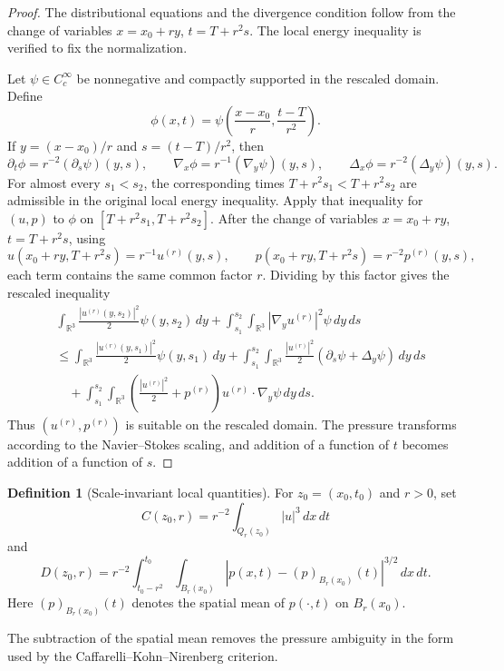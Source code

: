 \documentclass[11pt]{amsart}
\theoremstyle{plain}
\theoremstyle{definition}
\newtheorem{definition}[definition]{Definition}
\theoremstyle{remark}
\numberwithin{equation}{section}
\begin{document}
\begin{proof}
The distributional equations and the divergence condition follow from the
change of variables \(x=x_0+ry\), \(t=T+r^2s\).  The local energy inequality
is verified to fix the normalization.

Let \(\psi\in C_c^\infty\) be nonnegative and compactly supported in the
rescaled domain.  Define
\[
  \phi(x,t)=
  \psi\left(\frac{x-x_0}{r},\frac{t-T}{r^2}\right).
\]
If \(y=(x-x_0)/r\) and \(s=(t-T)/r^2\), then
\[
  \partial_t\phi=r^{-2}(\partial_s\psi)(y,s),\qquad
  \nabla_x\phi=r^{-1}(\nabla_y\psi)(y,s),\qquad
  \Delta_x\phi=r^{-2}(\Delta_y\psi)(y,s).
\]
For almost every \(s_1<s_2\), the corresponding times
\(T+r^2s_1<T+r^2s_2\) are admissible in the original local energy inequality.
Apply that inequality for \((u,p)\) to \(\phi\) on
\([T+r^2s_1,T+r^2s_2]\).  After the change of variables
\(x=x_0+ry\), \(t=T+r^2s\), using
\[
  u(x_0+ry,T+r^2s)=r^{-1}u^{(r)}(y,s),\qquad
  p(x_0+ry,T+r^2s)=r^{-2}p^{(r)}(y,s),
\]
each term contains the same common factor \(r\).  Dividing by this factor gives
the rescaled inequality
\[
\begin{aligned}
&\int_{\mathbb R^3}\frac{|u^{(r)}(y,s_2)|^2}{2}\psi(y,s_2)\,dy
 +\int_{s_1}^{s_2}\int_{\mathbb R^3}|\nabla_y u^{(r)}|^2\psi\,dy\,ds \\
&\le
 \int_{\mathbb R^3}\frac{|u^{(r)}(y,s_1)|^2}{2}\psi(y,s_1)\,dy
 +\int_{s_1}^{s_2}\int_{\mathbb R^3}
   \frac{|u^{(r)}|^2}{2}(\partial_s\psi+\Delta_y\psi)\,dy\,ds \\
&\quad
 +\int_{s_1}^{s_2}\int_{\mathbb R^3}
   \left(\frac{|u^{(r)}|^2}{2}+p^{(r)}\right)
   u^{(r)}\cdot\nabla_y\psi\,dy\,ds .
\end{aligned}
\]
Thus \((u^{(r)},p^{(r)})\) is suitable on the rescaled domain.  The pressure
transforms according to the Navier--Stokes scaling, and addition of a function
of \(t\) becomes addition of a function of \(s\).
\end{proof}

\begin{definition}[Scale-invariant local quantities]
For \(z_0=(x_0,t_0)\) and \(r>0\), set
\[
  C(z_0,r)=r^{-2}\int_{Q_r(z_0)} |u|^3\,dx\,dt
\]
and
\[
  D(z_0,r)=r^{-2}
  \int_{t_0-r^2}^{t_0}\int_{B_r(x_0)}
  |p(x,t)-(p)_{B_r(x_0)}(t)|^{3/2}\,dx\,dt.
\]
Here \((p)_{B_r(x_0)}(t)\) denotes the spatial mean of \(p(\cdot,t)\) on
\(B_r(x_0)\).
\end{definition}

The subtraction of the spatial mean removes the pressure ambiguity in the form
used by the Caffarelli--Kohn--Nirenberg criterion.
\end{document}
